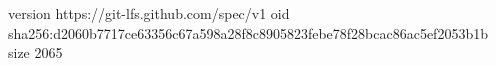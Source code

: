 version https://git-lfs.github.com/spec/v1
oid sha256:d2060b7717ce63356c67a598a28f8c8905823febe78f28bcac86ac5ef2053b1b
size 2065
